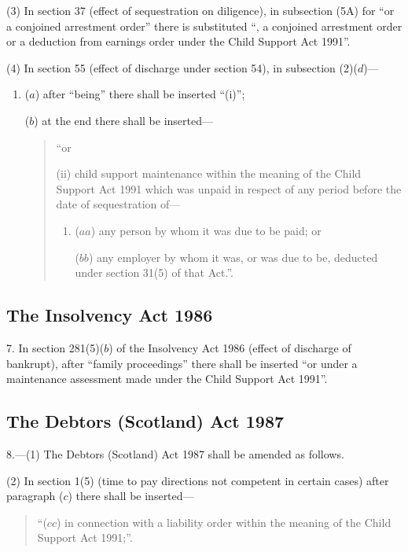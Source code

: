 \documentclass[a4paper]{article}
\begin{document}
(3) In section 37 (effect of sequestration on diligence), in subsection (5A) for “or a conjoined arrestment order” there is substituted “, a conjoined arrestment order or a deduction from earnings order under the Child Support Act 1991”.

(4) In section 55 (effect of discharge under section 54), in subsection (2)($d$)---
\begin{enumerate}\item[]
($a$) after “being” there shall be inserted “(i)”;

($b$) at the end there shall be inserted---
\begin{quotation}
 “or

(ii) child support maintenance within the meaning of the Child Support Act 1991 which was unpaid in respect of any period before the date of sequestration of---
\begin{enumerate}\item[]
($aa$) any person by whom it was due to be paid; or

($bb$) any employer by whom it was, or was due to be, deducted under section 31(5) of that Act.”.
\end{enumerate}
\end{quotation}
\end{enumerate}

\subsection*{The Insolvency Act 1986}

7. In section 281(5)($b$) of the Insolvency Act 1986 (effect of discharge of bankrupt), after “family proceedings” there shall be inserted “or under a maintenance assessment made under the Child Support Act 1991”.

\subsection*{The Debtors (Scotland) Act 1987}

8.---(1) The Debtors (Scotland) Act 1987 shall be amended as follows.

(2) In section 1(5) (time to pay directions not competent in certain cases) after paragraph ($c$) there shall be inserted---
\begin{quotation}
“($cc$) in connection with a liability order within the meaning of the Child Support Act 1991;”.
\end{quotation}
\end{document}

